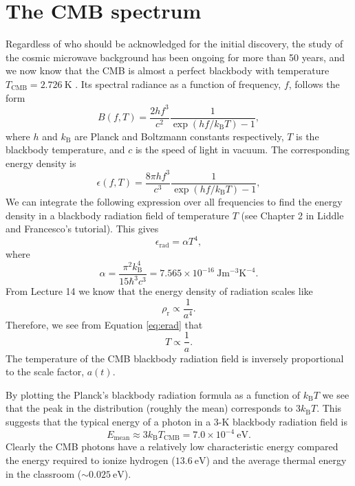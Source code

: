 \documentclass[a4paper,12pt]{article}
\theoremstyle{remark}
\newcommand{\mrm}[1]{\mathrm{#1}}
\renewcommand{\=}[1]{\stackrel{#1}{=}} %
\theoremstyle{plain}
\theoremstyle{definition}
\begin{document}
\section{The CMB spectrum}
Regardless of who should be acknowledged for the initial discovery, the study of the cosmic microwave background has been ongoing for more than 50 years, and we now know that the CMB is almost a perfect blackbody with temperature $T_{\mrm{CMB}} = 2.726\:\mrm{K}$ \cite{Fixsen2009}. Its spectral radiance as a function of frequency, $f$, follows the form
\begin{equation}
B(f, T) = \frac{2hf^{3}}{c^{2}}\frac{1}{\exp(hf /k_{\mrm{B}}T) -1},
\end{equation}
where $h$ and $k_{\mrm{B}}$ are Planck and Boltzmann constants respectively, $T$ is the blackbody temperature, and $c$ is the speed of light in vacuum. The corresponding energy density is
\begin{equation}
\epsilon (f, T) = \frac{8\pi hf^{3}}{c^{3}}\frac{1}{\exp(hf /k_{\mrm{B}}T) -1},
\end{equation}
We can integrate the following expression over all frequencies to find the energy density in a blackbody radiation field of temperature $T$ (see Chapter 2 in Liddle and Francesco's tutorial). This gives
\begin{equation}
\epsilon _\mrm{rad} = \alpha T^{4},
\label{eq:erad}
\end{equation}
where 
\begin{equation}
\alpha = \frac{\pi ^{2} k_\mrm{B}^{4}}{15 \hbar ^{3} c^{3}} = 7.565 \times 10 ^{-16} \:\mrm{J m^{-3} K^{-4}}.
\end{equation}
From Lecture 14 we know that the energy density of radiation scales like
\begin{equation}
\rho _\mrm{r} \propto \frac{1}{a^{4}}.
\end{equation}
Therefore, we see from Equation \ref{eq:erad} that 
\begin{equation}
T \propto \frac{1}{a}.
\label{eq:Tvsa}
\end{equation}
The temperature of the CMB blackbody radiation field is inversely proportional to the scale factor, $a(t)$. 

By plotting the Planck's blackbody radiation formula as a function of $k_\mrm{B}T$ we see that the peak in the distribution (roughly the mean) corresponds to $3k_\mrm{B}T$. This suggests that the typical energy of a photon in a 3-K blackbody radiation field is 
\begin{equation}
E _\mrm{mean} \approx 3 k_\mrm{B}T_\mrm{CMB} = 7.0 \times 10^{-4} \:\mrm{eV}.
\end{equation}
Clearly the CMB photons have a relatively low characteristic energy compared the energy required to ionize hydrogen ($13.6 \: \mrm{eV}$) and the average thermal energy in the classroom ($\sim 0.025 \: \mrm{eV}$).
\end{document}
